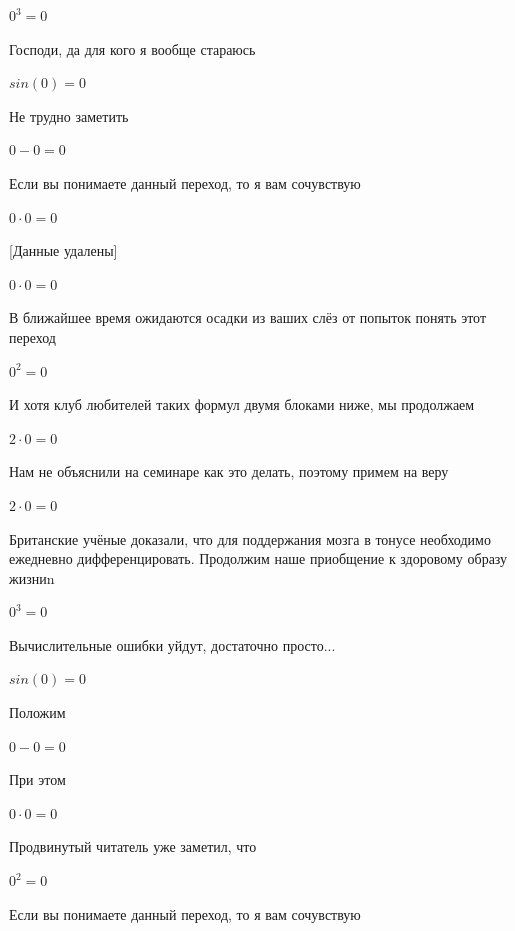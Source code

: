 \documentclass[12pt,a4paper,fleqn]{article}
\begin{document}
\begin{center}$0^{3} = 0$\end{center}
Господи, да для кого я вообще стараюсь

\begin{center}$sin(0) = 0$\end{center}
Не трудно заметить

\begin{center}$0-0 = 0$\end{center}
Если вы понимаете данный переход, то я вам сочувствую

\begin{center}$0 \cdot 0 = 0$\end{center}
[Данные удалены]

\begin{center}$0 \cdot 0 = 0$\end{center}
В ближайшее время ожидаются осадки из ваших слёз от попыток понять этот переход

\begin{center}$0^{2} = 0$\end{center}
И хотя клуб любителей таких формул двумя блоками ниже, мы продолжаем

\begin{center}$2 \cdot 0 = 0$\end{center}
Нам не объяснили на семинаре как это делать, поэтому примем на веру

\begin{center}$2 \cdot 0 = 0$\end{center}
Британские учёные доказали, что для поддержания мозга в тонусе необходимо ежедневно дифференцировать. Продолжим наше приобщение к здоровому образу жизниn

\begin{center}$0^{3} = 0$\end{center}
Вычислительные ошибки уйдут, достаточно просто...

\begin{center}$sin(0) = 0$\end{center}
Положим

\begin{center}$0-0 = 0$\end{center}
При этом

\begin{center}$0 \cdot 0 = 0$\end{center}
Продвинутый читатель уже заметил, что

\begin{center}$0^{2} = 0$\end{center}
Если вы понимаете данный переход, то я вам сочувствую
\end{document}
